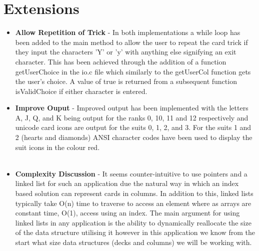 \documentclass[11]{article}
\begin{document}
	\section{Extensions}
		\begin{itemize}
			\item \textbf{Allow Repetition of Trick} - In both implementations a while loop has been added to the main method to allow the user to repeat the card trick if they input the characters 'Y' or 'y' with anything else signifying an exit character. This has been achieved through the addition of a function getUserChoice in the io.c file which similarly to the getUserCol function gets the user's choice. A value of true is returned from a subsequent function isValidChoice if either character is entered.
				
			\item \textbf{Improve Ouput} - Improved output has been implemented with the letters A, J, Q, and K being output for the ranks 0, 10, 11 and 12 respectively and unicode card icons are output for the suits 0, 1, 2, and 3. For the suits 1 and 2 (hearts and diamonds) ANSI character codes have been used to display the suit icons in the colour red. \\\\
		
			\item \textbf{Complexity Discussion} - It seems counter-intuitive to use pointers and a linked list for such an application due the natural way in which an index based solution can represent cards in columns. In addition to this, linked lists typically take O(n) time to traverse to access an element where as arrays are constant time, O(1), access using an index. The main argument for using linked lists in any application is the ability to dynamically reallocate the size of the data structure utilising it however in this application we know from the start what size data structures (decks and columns) we will be working with.
		\end{itemize}
		
\end{document}
